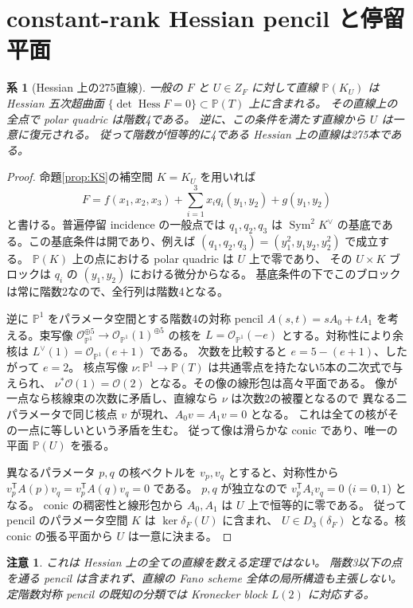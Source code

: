 \documentclass[11pt,a4paper]{ltjsarticle}
\newtheorem{corollary}[theorem]{系}
\newtheorem{remark}[theorem]{注意}
\newcommand{\PP}{\mathbb P}
\newcommand{\OO}{\mathcal O}
\newcommand{\Sym}{\operatorname{Sym}}
\newcommand{\Hess}{\operatorname{Hess}}
\begin{document}
\section{constant-rank Hessian pencil と停留平面}
\begin{corollary}[Hessian 上の275直線]\label{cor:hessian}
一般の $F$ と $U\in Z_F$ に対して直線 $\PP(K_U)$ は
Hessian 五次超曲面 $\{\det\Hess F=0\}\subset\PP(T)$ 上に含まれる。
その直線上の全点で polar quadric は階数4である。
逆に、この条件を満たす直線から $U$ は一意に復元される。
従って階数が恒等的に4である Hessian 上の直線は275本である。
\end{corollary}
\begin{proof}
命題\ref{prop:KS}の補空間 $K=K_U$ を用いれば
\[
 F=f(x_1,x_2,x_3)+\sum_{i=1}^3x_iq_i(y_1,y_2)+g(y_1,y_2)
\]
と書ける。普遍停留 incidence の一般点では $q_1,q_2,q_3$ は
$\Sym^2K^\vee$ の基底である。この基底条件は開であり、例えば
$(q_1,q_2,q_3)=(y_1^2,y_1y_2,y_2^2)$ で成立する。
$\PP(K)$ 上の点における polar quadric は $U$ 上で零であり、
その $U\times K$ ブロックは $q_i$ の $(y_1,y_2)$ における微分からなる。
基底条件の下でこのブロックは常に階数2なので、全行列は階数4となる。

逆に $\PP^1$ をパラメータ空間とする階数4の対称 pencil
$A(s,t)=sA_0+tA_1$ を考える。束写像
$\OO_{\PP^1}^{\oplus5}\to\OO_{\PP^1}(1)^{\oplus5}$ の核を
$L=\OO_{\PP^1}(-e)$ とする。対称性により余核は
$L^\vee(1)=\OO_{\PP^1}(e+1)$ である。
次数を比較すると $e=5-(e+1)$、したがって $e=2$。
核点写像 $\nu:\PP^1\to\PP(T)$ は共通零点を持たない5本の二次式で与えられ、
$\nu^*\OO(1)=\OO(2)$ となる。その像の線形包は高々平面である。
像が一点なら核線束の次数に矛盾し、直線なら $\nu$ は次数2の被覆となるので
異なる二パラメータで同じ核点 $v$ が現れ、$A_0v=A_1v=0$ となる。
これは全ての核がその一点に等しいという矛盾を生む。
従って像は滑らかな conic であり、唯一の平面 $\PP(U)$ を張る。

異なるパラメータ $p,q$ の核ベクトルを $v_p,v_q$ とすると、対称性から
$v_p^{\mathsf T}A(p)v_q=v_p^{\mathsf T}A(q)v_q=0$ である。
$p,q$ が独立なので $v_p^{\mathsf T}A_iv_q=0$ ($i=0,1$) となる。
conic の稠密性と線形包から $A_0,A_1$ は $U$ 上で恒等的に零である。
従って pencil のパラメータ空間 $K$ は $\ker\delta_F(U)$ に含まれ、
$U\in D_3(\delta_F)$ となる。核 conic の張る平面から $U$ は一意に決まる。
\end{proof}
\begin{remark}
これは Hessian 上の\emph{全ての}直線を数える定理ではない。
階数3以下の点を通る pencil は含まれず、直線の Fano scheme 全体の局所構造も主張しない。
定階数対称 pencil の既知の分類\cite{Boralevi}では Kronecker block $L(2)$ に対応する。
\end{remark}
\end{document}
